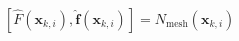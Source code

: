 $\left[ \hat{F}\left( \mathbf{x}_{k,i} \right) , \mathbf{\hat{f}}\left( \mathbf{x}_{k,i} \right) \right] =N_{\mathrm{mesh}}\left( \mathbf{x}_{k,i} \right)$